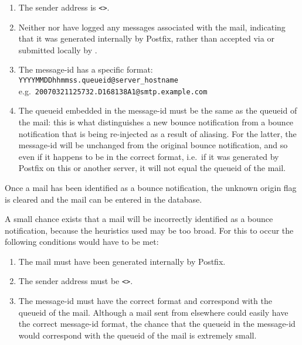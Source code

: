 \begin{enumerate}

    \item The sender address is \verb!<>!.\glsadd{<>}

    \item Neither  nor  have logged any
        messages associated with the mail, indicating that it was generated
        internally by Postfix, rather than accepted via  or
        submitted locally by .

    \item The message-id has a specific format: \newline{}
        \tab{} \texttt{YYYYMMDDhhmmss.queueid@server\_hostname} \newline{}
        e.g.\ \texttt{20070321125732.D168138A1@smtp.example.com}

    \item The queueid embedded in the message-id must be the same as the
        queueid of the mail: this is what distinguishes a new bounce
        notification from a bounce notification that is being re-injected
        as a result of aliasing.  For the latter, the message-id will be
        unchanged from the original bounce notification, and so even if it
        happens to be in the correct format, i.e.\ if it was generated by
        Postfix on this or another server, it will not equal the queueid of
        the mail.

\end{enumerate}

Once a mail has been identified as a bounce notification, the unknown
origin flag is cleared and the mail can be entered in the database.

A small chance exists that a mail will be incorrectly identified as a
bounce notification, because the heuristics used may be too broad.  For this to
occur the following conditions would have to be met:

\begin{enumerate}

    \squeezeitems{}

    \item The mail must have been generated internally by Postfix.

    \item The sender address must be \verb!<>!.\glsadd{<>}

    \item The message-id must have the correct format and correspond with
        the queueid of the mail.  Although a mail sent from elsewhere could
        easily have the correct message-id format, the chance that the
        queueid in the message-id would correspond with the queueid of the
        mail is extremely small.

\end{enumerate}


